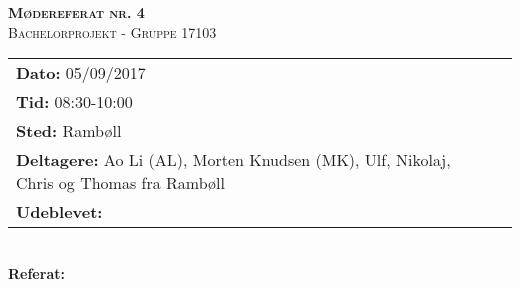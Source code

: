 
\newcommand{\HRule}{\rule{\linewidth}{0.1mm}}


	\begin{center}
		{\huge \bfseries \textsc{Mødereferat nr. 4}}\\
		\textsc{\large Bachelorprojekt - Gruppe 17103}\\[0.3cm]
	\end{center}
	\begin{tabular}{ll}
	\large \textbf{Dato:} 05/09/2017  	\\ %
	\large \textbf{Tid:}  08:30-10:00 	\\ %
	\large \textbf{Sted:} Rambøll		\\ %
	\large \textbf{Deltagere:} Ao Li (AL), Morten Knudsen (MK), Ulf, Nikolaj, Chris og Thomas fra Rambøll \\
	\large \textbf{Udeblevet:}
	\end{tabular}\\
	\phantom{\,}\hspace{0.1em} \large \textbf{Referat:}
